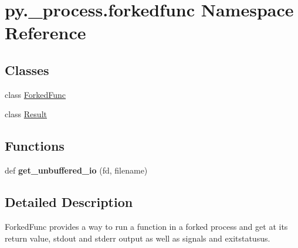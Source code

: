 \hypertarget{namespacepy_1_1__process_1_1forkedfunc}{}\section{py.\+\_\+process.\+forkedfunc Namespace Reference}
\label{namespacepy_1_1__process_1_1forkedfunc}
\subsection*{Classes}
\begin{DoxyCompactItemize}
\item 
class \hyperlink{classpy_1_1__process_1_1forkedfunc_1_1_forked_func}{Forked\+Func}
\item 
class \hyperlink{classpy_1_1__process_1_1forkedfunc_1_1_result}{Result}
\end{DoxyCompactItemize}
\subsection*{Functions}
\begin{DoxyCompactItemize}
\item 
\mbox{\label{namespacepy_1_1__process_1_1forkedfunc_a5588cf0fd462b2b5ebab31d9297d4ac1}} 
def {\bfseries get\+\_\+unbuffered\+\_\+io} (fd, filename)
\end{DoxyCompactItemize}


\subsection{Detailed Description}
\begin{DoxyVerb}ForkedFunc provides a way to run a function in a forked process
and get at its return value, stdout and stderr output as well
as signals and exitstatusus.
\end{DoxyVerb}
 